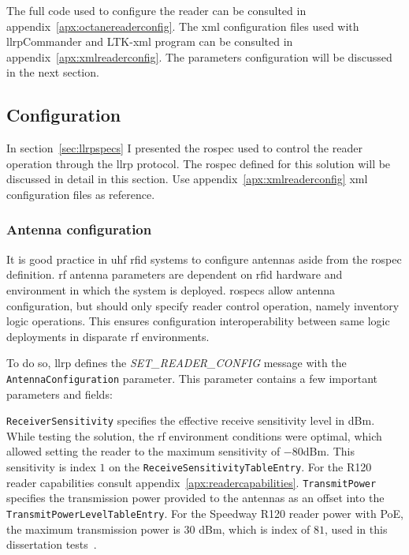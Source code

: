 The full code used to configure the reader can be consulted in appendix~\ref{apx:octanereaderconfig}.
The \ac{xml} configuration files used with \ac{llrp}Commander and LTK-\acs{xml} program can be consulted in appendix~\ref{apx:xmlreaderconfig}.
The parameters configuration will be discussed in the next section.

\subsection{Configuration}

In section~\ref{sec:llrpspecs} I presented the \ac{rospec} used to control the reader operation through the \ac{llrp} protocol. The \ac{rospec} defined for this solution will be discussed in detail in this section.
Use appendix~\ref{apx:xmlreaderconfig} \ac{xml} configuration files as reference.

\subsubsection{Antenna configuration}

It is good practice in \ac{uhf} \ac{rfid} systems to configure antennas aside from the \ac{rospec} definition. \ac{rf} antenna parameters are dependent on \ac{rfid} hardware and environment in which the system is deployed. \acp{rospec} allow antenna configuration, but should only specify reader control operation, namely inventory logic operations. This ensures configuration interoperability between same logic deployments in disparate \ac{rf} environments.

To do so, \ac{llrp} defines the \textit{SET\_READER\_CONFIG} message with the \texttt{AntennaConfiguration} parameter.
This parameter contains a few important parameters and fields:

\texttt{ReceiverSensitivity} specifies the effective receive sensitivity level in dBm. While testing the solution, the \ac{rf} environment conditions were optimal, which allowed setting the reader to the maximum sensitivity of $-80$dBm. This sensitivity is index $1$ on the \texttt{ReceiveSensitivityTableEntry}. For the R120 reader capabilities consult appendix~\ref{apx:readercapabilities}.
\texttt{TransmitPower} specifies the transmission power provided to the antennas as an offset into the \texttt{TransmitPowerLevelTableEntry}. For the Speedway R120 reader power with PoE, the maximum transmission power is $30$ dBm, which is index of $81$, used in this dissertation tests~\cite{ImpinjOctaneLLRP, SettingReceiveSensitivity}.

